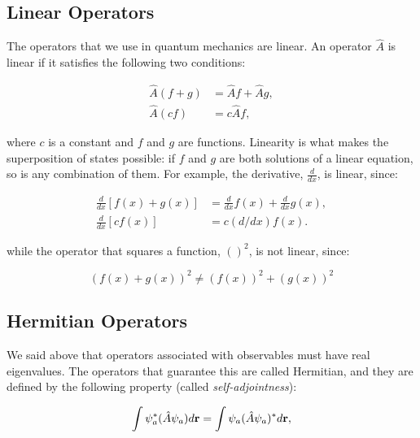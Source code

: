 \documentclass[
  english,
  9pt,
]{extbook}
\theoremstyle{definition}
\theoremstyle{definition}
\theoremstyle{definition}
\theoremstyle{definition}
\theoremstyle{remark}
\begin{document}
\subsection{Linear Operators}\label{linear-operators}

The operators that we use in quantum mechanics are linear. An operator \(\hat{A}\) is linear if it satisfies the following two conditions:

\begin{equation}
\begin{aligned}
\hat{A} (f + g)  &= \hat{A} f + \hat{A} g, \\
\hat{A} (c f) &= c \hat{A} f,
\end{aligned}
\label{eq:linop1}
\end{equation}

where \(c\) is a constant and \(f\) and \(g\) are functions. Linearity is what makes the superposition of states possible: if \(f\) and \(g\) are both solutions of a linear equation, so is any combination of them. For example, the derivative, \(\frac{d}{dx}\), is linear, since:

\begin{equation}
\begin{aligned}
\frac{d}{dx}[f(x) + g(x)] &=\frac{d}{dx}f(x) + \frac{d}{dx}g(x), \\
\frac{d}{dx}[c f(x)] &= c (d/dx) f(x).
\end{aligned}
\label{eq:linop2}
\end{equation}

while the operator that squares a function, \(()^2\), is not linear, since:

\begin{equation}
(f(x) + g(x))^2 \neq (f(x))^2 + (g(x))^2
\label{eq:linop3}
\end{equation}

\subsection{Hermitian Operators}\label{hermitian-operators}

We said above that operators associated with observables must have real eigenvalues. The operators that guarantee this are called Hermitian, and they are defined by the following property (called \emph{self-adjointness}):

\begin{equation}
\int \psi_a^{*} (\hat{A} \psi_a)d{\bf r} =  \int \psi_a (\hat{A} \psi_a)^{*}d{\bf r},
\label{eq:hop1}
\end{equation}
\end{document}
